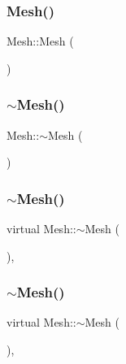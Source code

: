 \mbox{\label{class_mesh_a2af137f1571af89172b9c102302c416b}} 
\subsubsection{\texorpdfstring{Mesh()}{Mesh()}\hspace{0.1cm}{\footnotesize\ttfamily [1/3]}}
{\footnotesize\ttfamily Mesh\+::\+Mesh (\begin{DoxyParamCaption}{ }\end{DoxyParamCaption})}

\mbox{\label{class_mesh_a5efe4da1a4c0971cfb037bd70304c303}} 
\subsubsection{\texorpdfstring{$\sim$Mesh()}{~Mesh()}\hspace{0.1cm}{\footnotesize\ttfamily [3/10]}}
{\footnotesize\ttfamily Mesh\+::$\sim$\+Mesh (\begin{DoxyParamCaption}{ }\end{DoxyParamCaption})}

\mbox{\label{class_mesh_ad6a041191ed55c693254e945ce2869ff}} 
\subsubsection{\texorpdfstring{$\sim$Mesh()}{~Mesh()}\hspace{0.1cm}{\footnotesize\ttfamily [4/10]}}
{\footnotesize\ttfamily virtual Mesh\+::$\sim$\+Mesh (\begin{DoxyParamCaption}{ }\end{DoxyParamCaption})\hspace{0.3cm}{\ttfamily [inline]}, {\ttfamily [virtual]}}

\mbox{\label{class_mesh_ad6a041191ed55c693254e945ce2869ff}} 
\subsubsection{\texorpdfstring{$\sim$Mesh()}{~Mesh()}\hspace{0.1cm}{\footnotesize\ttfamily [5/10]}}
{\footnotesize\ttfamily virtual Mesh\+::$\sim$\+Mesh (\begin{DoxyParamCaption}{ }\end{DoxyParamCaption})\hspace{0.3cm}{\ttfamily [inline]}, {\ttfamily [virtual]}}

